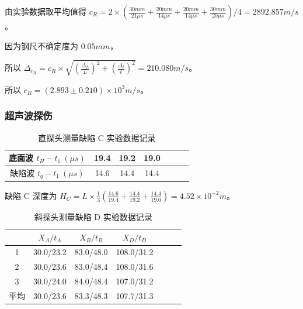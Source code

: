 \documentclass[a4paper]{article}
\begin{document}
            \par 由实验数据取平均值得 $c_R=2\times (\frac{30mm}{21\mu s}+\frac{20mm}{14\mu s}+\frac{20mm}{14\mu s}+\frac{30mm}{20\mu s})/4=2892.857m/s$。

            \par 因为钢尺不确定度为 $0.05mm$，

            \par 所以 $\Delta_{c_R}=c_R\times\sqrt{(\frac{\Delta_L}{L})^2+(\frac{\Delta_t}{t})^2}=210.080m/s$。

            \par 所以 $c_R=(2.893\pm 0.210)\times 10^3m/s$。

        \subsubsection{超声波探伤}

            \begin{table}[H]
                \centering
                \begin{tabular}{|c|c|c|c|c|c|c|}
                    \hline
                    底面波 $t_H-t_1\ (\mu s)$   & 19.4  & 19.2  & 19.0  \\ \hline
                    缺陷波 $t_q-t_1\ (\mu s)$   & 14.6  & 14.4  & 14.4  \\ \hline
                \end{tabular}
                \caption{直探头测量缺陷 C 实验数据记录}
            \end{table}

            \par 缺陷 C 深度为 $H_C=L\times\frac{1}{3}(\frac{14.6}{19.4}+\frac{14.4}{19.2}+\frac{14.4}{19.0})=4.52\times 10^{-2}m$。
            
            \begin{table}[H]
                \centering
                \begin{tabular}{|c|c|c|c|c|c|c|}
                    \hline
                        & $X_A/t_A$     & $X_B/t_B$     & $X_D/t_D$     \\ \hline
                    1   & 30.0/23.2     & 83.0/48.0     & 108.0/31.2    \\ \hline
                    2   & 30.0/23.6     & 83.0/48.4     & 108.0/31.6    \\ \hline
                    3   & 30.0/24.0     & 84.0/48.4     & 107.0/31.2    \\ \hline
                    平均& 30.0/23.6     & 83.3/48.3     & 107.7/31.3    \\ \hline
                \end{tabular}
                \caption{斜探头测量缺陷 D 实验数据记录}
            \end{table}
\end{document}
